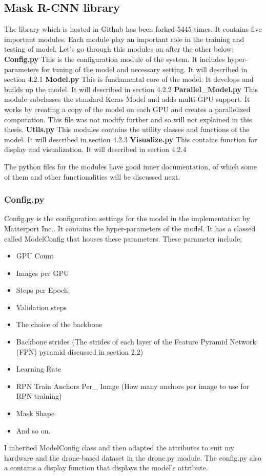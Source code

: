 \subsection{Mask R-CNN library}
The library which is hosted in Github has been forked 5445 times. It contains five important modules. Each module play an important role in the training and testing of model. Let’s go through this modules on after the other below:
\textbf{Config.py}
This is the configuration module of the system. It includes hyper-parameters for tuning of the model and necessary setting. It will described in section 4.2.1
\textbf{Model.py}
This is fundamental core of the model. It develops and builds up the model. It will described in section 4.2.2	
\textbf{Parallel\_Model.py} 
This module subclasses the standard Keras Model and adds multi-GPU support. It works by creating a copy of the model on each GPU and creates a parallelized computation.
This file was not modify further and so will not explained in this thesis.
\textbf{Utils.py} 
This modules contains the utility classes and functions of the model. It will described in section 4.2.3
\textbf{Visualize.py}
This contains function for display and visualization. It will described in section 4.2.4

The python files for the modules have good inner documentation, of which some of them and other functionalities will be discussed next.

\subsubsection{Config.py}
Config.py is the configuration settings for the model in the implementation by Matterport Inc.. It contains the hyper-parameters of the model. It has a classed called ModelConfig that houses these parameters. These parameter include;
 \begin{itemize}
   \item GPU Count
   \item Images per GPU
   \item Steps per Epoch
   \item Validation steps
   \item The choice of the backbone
   \item Backbone strides (The strides of each layer of the Feature Pyramid Network (FPN) pyramid discussed in section 2.2)
   \item Learning Rate
   \item RPN Train Anchors Per\_ Image (How many anchors per image to use for RPN training)
   \item Mask Shape
   \item And so on.
   
 \end{itemize}
 I inherited ModelConfig  class and then adapted the attributes to suit my hardware and the drone-based dataset in the drone.py module.  The config.py also a contains a display function that displays the model’s attribute.

